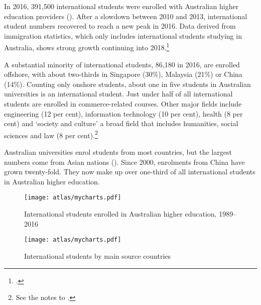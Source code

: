 \documentclass{grattan}
\begin{document}
In 2016, 391,500 international students were enrolled with Australian higher education providers (). After a slowdown between 2010 and 2013, international student numbers recovered to reach a new peak in 2016. Data derived from immigration statistics, which only includes international students studying in Australia, shows strong growth continuing into 2018.\footcites[][]{DepartmentofEducationandTraining2018internationalstude}[][]{DepartmentofHomeAffairs2018studentvisas}

A substantial minority of international students, 86,180 in 2016, are enrolled offshore, with about two-thirds in Singapore (30\%), Malaysia (21\%) or China (14\%). Counting only onshore students, about one in five students in Australian universities is an international student. Just under half of all international students are enrolled in commerce-related courses. Other major fields include engineering (12 per cent), information technology (10 per cent), health (8 per cent) and `society and culture' a broad field that includes humanities, social sciences and law (8 per cent).\footnote{See the notes to .}

Australian universities enrol students from most countries, but the largest numbers come from Asian nations (). Since 2000, enrolments from China have grown twenty-fold. They now make up over one-third of all international students in Australian higher education.


    \begin{figure} %
    \caption{International students enrolled in Australian higher education, 1989--2016}\label{fig:international-students-enrolled-in-australian-higher-education-19892016}
    \texttt{[image: atlas/mycharts.pdf]}
    \end{figure}




    \begin{figure} %
    \caption{International students by main source countries}\label{fig:international-students-by-main-source-countries}
    \texttt{[image: atlas/mycharts.pdf]}
    \end{figure}
\end{document}
